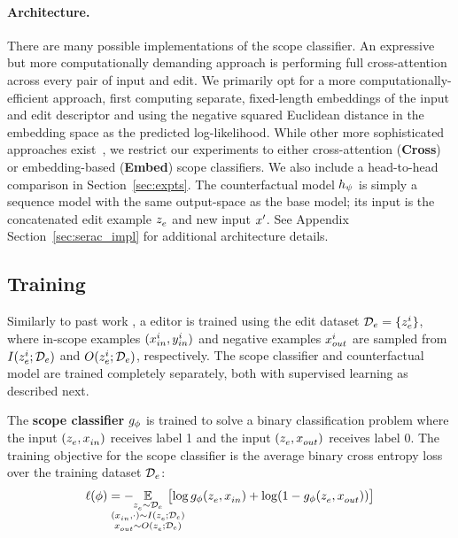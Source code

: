 \documentclass{article}
\begin{document}
\paragraph{Architecture.} There are many possible implementations of the scope classifier. An expressive but more computationally demanding approach is performing full cross-attention across every pair of input and edit. We primarily opt for a more computationally-efficient approach, first computing separate, fixed-length embeddings of the input and edit descriptor \citep[as in][]{karpukhin-etal-2020-dense} and using the negative squared Euclidean distance in the embedding space as the predicted log-likelihood. While other more sophisticated approaches exist~\citep{khattab2020colbert,santhanam2021colbert}, we restrict our experiments to either cross-attention (\textbf{Cross}) or embedding-based (\textbf{Embed}) scope classifiers. We also include a head-to-head comparison in Section~\ref{sec:expts}. The counterfactual model $\rep$ is simply a sequence model with the same output-space as the base model; its input is the concatenated edit example $\ze$ and new input $\xunk$. See Appendix Section~\ref{sec:serac_impl} for additional architecture details.

\subsection{Training {\name}}
\label{sec:editortraining}
Similarly to past work \citep{Cao2021EditingFK,mitchell2021fast,hase2021language}, a {\name} editor is trained using the edit dataset $\editdata =\{\ze[i]\}$, where in-scope examples $(\xtest[i], \ytest[i])$ and negative examples $\xloc[i]$ are sampled from $I(\ze[i]; \editdata)$ and $O(\ze[i]; \editdata)$, respectively. The scope classifier and counterfactual model are trained completely separately, both with supervised learning as described next.

The \textbf{scope classifier} $\cls$ is trained to solve a binary classification problem where the input $(\ze, \xtest)$ receives label 1 and the input $(\ze, \xloc)$ receives label 0. The training objective for the scope classifier is the average binary cross entropy loss over the training dataset $\editdata$:
\begin{equation}
\ell(\phi) = - \hspace{-7mm} \E_{\substack{\ze \sim \editdata\\
(\xtest, \cdot) \sim I(\ze; \editdata)\\ 
\xloc \sim O(\ze; \editdata)}}
\hspace{-5mm} \bigl[
\log \cls(\ze, \xtest) + \log (1-\cls(\ze, \xloc))
\bigr]
\end{equation}
\end{document}
